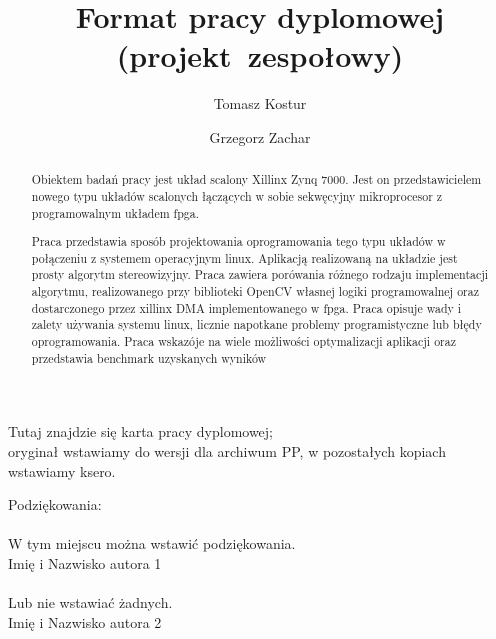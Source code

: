 \documentclass[english, polish, bachelor, a4paper,oneside]{ppciethesis} %
\author{Tomasz Kostur \and Grzegorz Zachar} %
\title{Format pracy dyplomowej (projekt~zespołowy)} %
\begin{document}


\frontmatter\pagestyle{empty}%
\maketitle
\cleardoublepage%
\Large

\thispagestyle{empty}\vspace*{\fill}
\cleardoublepage

\thispagestyle{empty}\vspace*{\fill}%
\begin{center}Tutaj znajdzie się karta pracy dyplomowej;\\oryginał wstawiamy do wersji dla archiwum PP, w pozostałych kopiach wstawiamy ksero.\end{center}%
\vfill
\cleardoublepage

\noindent
Podziękowania:\\ \\
\noindent
W tym miejscu można wstawić podziękowania.\\
Imię i Nazwisko autora 1
\\ \\
\noindent
Lub nie wstawiać żadnych.\\
Imię i Nazwisko autora 2
\\
\cleardoublepage
\thispagestyle{empty}\vspace*{\fill}
\cleardoublepage

\pagestyle{ppfcmthesis}%
\tableofcontents* \cleardoublepage%

\begin{abstract}
Obiektem badań pracy jest układ scalony Xillinx Zynq 7000.
Jest on przedstawicielem nowego typu układów scalonych łączących w sobie
sekwęcyjny mikroprocesor z programowalnym układem fpga.

Praca przedstawia sposób projektowania oprogramowania tego typu układów w połączeniu
z systemem operacyjnym linux.
Aplikacją realizowaną na układzie jest prosty algorytm stereowizyjny.
Praca zawiera porówania różnego rodzaju implementacji algorytmu, realizowanego
przy biblioteki OpenCV własnej logiki programowalnej oraz dostarczonego przez
xillinx DMA implementowanego w fpga. Praca opisuje wady i zalety używania
systemu linux, licznie napotkane problemy programistyczne lub błędy oprogramowania.
Praca wskazóje na wiele możliwości optymalizacji aplikacji oraz przedstawia benchmark
uzyskanych wyników
\end{abstract}
\end{document}
